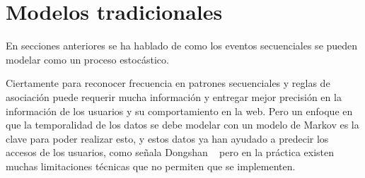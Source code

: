 \section{Modelos tradicionales}

%
En secciones anteriores se ha hablado de como los eventos secuenciales se pueden modelar como un proceso estocástico.

Ciertamente para reconocer frecuencia en patrones secuenciales y reglas de asociación puede requerir mucha  información y entregar mejor precisión en la información de los usuarios y su comportamiento en la web. Pero un enfoque en que la temporalidad de los datos se debe modelar con un modelo de Markov es la clave para poder realizar esto, y estos datos ya han ayudado a predecir los accesos de los usuarios, como señala Dongshan \etal~\cite{Dongshan2002} pero en la práctica existen muchas limitaciones técnicas que no permiten que se implementen. 


 






